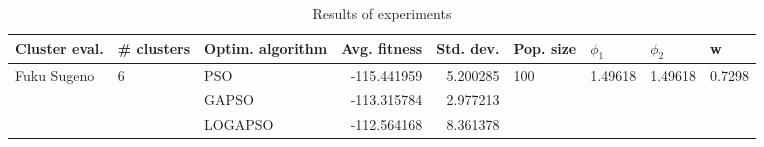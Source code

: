 \begin{table}
\centering
\caption{Results of experiments}
\begin{tabular}{lllrrllll}
\toprule
               Cluster eval. &        \# clusters & Optim. algorithm &  Avg. fitness &  Std. dev. &            Pop. size &               $\phi_{1}$ &               $\phi_{2}$ &                       w \\
\midrule
\multirow{3}{*}{Fuku Sugeno} & \multirow{3}{*}{6} &              PSO &   -115.441959 &   5.200285 & \multirow{3}{*}{100} & \multirow{3}{*}{1.49618} & \multirow{3}{*}{1.49618} & \multirow{3}{*}{0.7298} \\
                             &                    &            GAPSO &   -113.315784 &   2.977213 &                      &                          &                          &                         \\
                             &                    &          LOGAPSO &   -112.564168 &   8.361378 &                      &                          &                          &                         \\
\bottomrule
\end{tabular}
\end{table}
